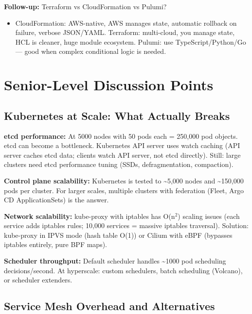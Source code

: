 \documentclass[11pt]{article}
\providecommand{\tightlist}{\setlength{\itemsep}{1pt}\setlength{\parskip}{0pt}}
\begin{document}
\textbf{Follow-up:} Terraform vs CloudFormation vs Pulumi?

\begin{itemize}
\tightlist
\item
  CloudFormation: AWS-native, AWS manages state, automatic rollback on failure, verbose JSON/YAML. Terraform: multi-cloud, you manage state, HCL is cleaner, huge module ecosystem. Pulumi: use TypeScript/Python/Go --- good when complex conditional logic is needed.
\end{itemize}

\section{Senior-Level Discussion Points}\label{senior-level-discussion-points}

\subsection{Kubernetes at Scale: What Actually Breaks}\label{kubernetes-at-scale-what-actually-breaks}

\textbf{etcd performance:} At 5000 nodes with 50 pods each = 250,000 pod objects. etcd can become a bottleneck. Kubernetes API server uses watch caching (API server caches etcd data; clients watch API server, not etcd directly). Still: large clusters need etcd performance tuning (SSDs, defragmentation, compaction).

\textbf{Control plane scalability:} Kubernetes is tested to \textasciitilde5,000 nodes and \textasciitilde150,000 pods per cluster. For larger scales, multiple clusters with federation (Fleet, Argo CD ApplicationSets) is the answer.

\textbf{Network scalability:} kube-proxy with iptables has O(n\(^2\)) scaling issues (each service adds iptables rules; 10,000 services = massive iptables traversal). Solution: kube-proxy in IPVS mode (hash table O(1)) or Cilium with eBPF (bypasses iptables entirely, pure BPF maps).

\textbf{Scheduler throughput:} Default scheduler handles \textasciitilde1000 pod scheduling decisions/second. At hyperscale: custom schedulers, batch scheduling (Volcano), or scheduler extenders.

\subsection{Service Mesh Overhead and Alternatives}\label{service-mesh-overhead-and-alternatives}
\end{document}
